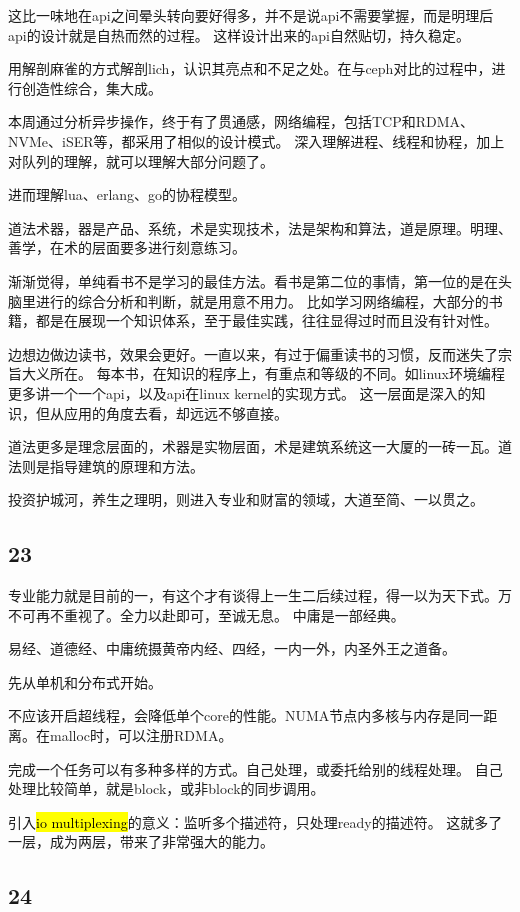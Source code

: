 这比一味地在api之间晕头转向要好得多，并不是说api不需要掌握，而是明理后api的设计就是自热而然的过程。
这样设计出来的api自然贴切，持久稳定。

用解剖麻雀的方式解剖lich，认识其亮点和不足之处。在与ceph对比的过程中，进行创造性综合，集大成。

本周通过分析异步操作，终于有了贯通感，网络编程，包括TCP和RDMA、NVMe、iSER等，都采用了相似的设计模式。
深入理解进程、线程和协程，加上对队列的理解，就可以理解大部分问题了。

进而理解lua、erlang、go的协程模型。

道法术器，器是产品、系统，术是实现技术，法是架构和算法，道是原理。明理、善学，在术的层面要多进行刻意练习。

渐渐觉得，单纯看书不是学习的最佳方法。看书是第二位的事情，第一位的是在头脑里进行的综合分析和判断，就是用意不用力。
比如学习网络编程，大部分的书籍，都是在展现一个知识体系，至于最佳实践，往往显得过时而且没有针对性。

边想边做边读书，效果会更好。一直以来，有过于偏重读书的习惯，反而迷失了宗旨大义所在。
每本书，在知识的程序上，有重点和等级的不同。如linux环境编程更多讲一个一个api，以及api在linux kernel的实现方式。
这一层面是深入的知识，但从应用的角度去看，却远远不够直接。

道法更多是理念层面的，术器是实物层面，术是建筑系统这一大厦的一砖一瓦。道法则是指导建筑的原理和方法。

投资护城河，养生之理明，则进入专业和财富的领域，大道至简、一以贯之。

\subsection{23}

专业能力就是目前的一，有这个才有谈得上一生二后续过程，得一以为天下式。万不可再不重视了。全力以赴即可，至诚无息。
中庸是一部经典。

易经、道德经、中庸统摄黄帝内经、四经，一内一外，内圣外王之道备。

先从单机和分布式开始。

不应该开启超线程，会降低单个core的性能。NUMA节点内多核与内存是同一距离。在malloc时，可以注册RDMA。

完成一个任务可以有多种多样的方式。自己处理，或委托给别的线程处理。
自己处理比较简单，就是block，或非block的同步调用。

引入\hl{io multiplexing}的意义：监听多个描述符，只处理ready的描述符。
这就多了一层，成为两层，带来了非常强大的能力。

\subsection{24}


